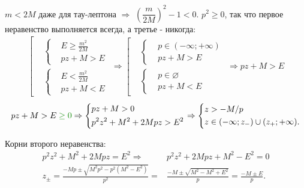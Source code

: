 \documentclass[a4paper,12pt,landscape]{article}
\begin{document}
$m<2M$ даже для тау-лептона $\Rightarrow$ $\left(\dfrac{m}{2M}\right)^{2}-1<0$. $p^{2}\ge{}0$, так что первое неравенство выполняется всегда, а третье - никогда:
\begin{align*}
\left[
\begin{aligned}
&\left\lbrace
\begin{aligned}
&E\ge{}\frac{m^{2}}{2M}\\
&pz+M>E
\end{aligned}\right.\\
&\left\lbrace
\begin{aligned}
&E<\frac{m^{2}}{2M}\\
&pz+M<E
\end{aligned}\right.
\end{aligned}\right.\Rightarrow
\left[
\begin{aligned}
&\left\lbrace
\begin{aligned}
&p\in(-\infty;+\infty)\\
&pz+M>E
\end{aligned}\right.\\
&\left\lbrace
\begin{aligned}
&p\in\varnothing\\
&pz+M<E
\end{aligned}\right.
\end{aligned}\right.\Rightarrow
\boxed{pz+M>E}
\end{align*}
\begin{align}
pz+M>E{\color{MYgreen}{}\ge{}0}\Rightarrow
\left\lbrace
\begin{aligned}
&pz+M>0\\
&p^{2}z^{2}+M^{2}+2Mpz>E^{2}
\end{aligned}\right.\Rightarrow
\left\lbrace
\begin{aligned}
&z>-M/p\\
&z\in(-\infty;z_{-})\cup(z_{+};+\infty).
\end{aligned}\right.
\end{align}

Корни второго неравенства:
\begin{align*}
p^{2}z^{2}+M^{2}+2Mpz=E^{2}\Rightarrow{}& p^{2}z^{2}+2Mpz+M^{2}-E^{2}=0\\
z_{\pm}=\frac{-Mp\pm\sqrt{M^{2}p^{2}-p^{2}(M^{2}-E^{2})}}{p^{2}}={}&\frac{-M\pm\sqrt{M^{2}-M^{2}+E^{2}}}{p}=\boxed{\frac{-M\pm{}E}{p}.}
\end{align*}
\end{document}
